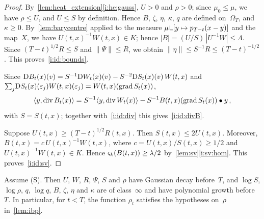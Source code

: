 \documentclass[a4paper,twoside,leqno]{article}
\newcommand{\sv}[1]{\varsigma_{#1}}        %
\begin{document}
\begin{proof}
    By~\ref{lem:heat_extension}\ref{i:he:gauss}, $U > 0$ and $\rho > 0$; since $\mu_0 \le \mu$, we
    have $\rho \le U$, and $U \le S$ by definition. Hence $B$, $\zeta$, $\eta$, $\kappa$, $q$ are
    defined on~$\Omega_T$, and $\kappa \ge 0$. By~\ref{lem:barycentre} applied to the measure $\mu
    \restrict [y \mapsto p_{T-t}(x-y)]$ and the map~$X$, we have $U(t,x)^{-1} W(t,x) \in K$; hence
    $|B| = (U/S) \, |U^{-1} W| \le \Lambda$. Since $(T-t)^{1/2} R \le S$ and $\|\Psi\| \le R$, we
    obtain $\|\eta\| \le S^{-1} R \le (T-t)^{-1/2}$. This proves~\ref{i:id:bounds}.

    Since $\mathrm{D} B_t(x)(v) = S^{-1} \mathrm{D} W_t(x)(v) - S^{-2} \mathrm{D} S_t(x)(v) \, W(t,x)$ and
    ${\textstyle\sum_{j}^{}} \mathrm{D} S_t(x)(\varepsilon_j) W(t,x)(\varepsilon_j) = W(t,x)(\operatorname{grad} S_t(x))$,
    \begin{displaymath}
        \langle y, \mathrm{div}\, B_t(x) \rangle = S^{-1} \langle y, \mathrm{div}\, W_t(x) \rangle
        - S^{-1} B(t,x)(\operatorname{grad} S_t(x)) \bullet y \,,
    \end{displaymath}
    with $S = S(t,x)$; together with~\ref{i:id:div} this gives~\ref{i:id:divB}.

    Suppose $U(t,x) \ge (T-t)^{1/2} R(t,x)$. Then $S(t,x) \le 2 U(t,x)$. Moreover, $B(t,x) = c
    \, U(t,x)^{-1} W(t,x)$, where $c = U(t,x) / S(t,x) \ge 1/2$ and $U(t,x)^{-1} W(t,x) \in K$.
    Hence $\sv{\vdim}(B(t,x)) \ge \lambda/2$ by~\ref{lem:sv}\ref{i:sv:hom}. This proves~\ref{i:id:sv}.
\end{proof}

\begin{lemma}
    \label{lem:regularity}
    Assume (S). Then $U$, $W$, $R$, $\Psi$, $S$ and $\rho$ have Gaussian decay before~$T$, and
    $\log S$, $\log \rho$, $q$, $\log q$, $B$, $\zeta$, $\eta$ and $\kappa$ are of class~$\infty$
    and have polynomial growth before~$T$. In particular, for $t < T$, the function $\rho_t$
    satisfies the hypotheses on~$\rho$ in~\ref{lem:ibp}.
\end{lemma}
\end{document}
